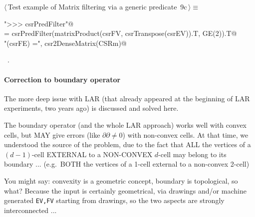 \documentclass[11pt,oneside]{article}    %
\begin{document}
\begin{flushleft} \small \label{scrap17}
\protect{}$\langle\,$Test example of Matrix filtering via a generic predicate\nobreak\ {\footnotesize 9c}$\,\rangle\equiv$
\vspace{-1ex}
\begin{list}{}{} \item
\mbox{}\verb@print "\n>>> csrPredFilter"@\\
\mbox{}\verb@CSRm = csrPredFilter(matrixProduct(csrFV, csrTranspose(csrEV)).T, GE(2)).T@\\
\mbox{}\verb@print "\nccsrPredFilter(csrFE) =\n", csr2DenseMatrix(CSRm)@\\
\mbox{}\verb@@{\NWsep}
\end{list}
\vspace{-1ex}
\footnotesize\addtolength{\baselineskip}{-1ex}
\begin{list}{}{\setlength{\itemsep}{-\parsep}\setlength{\itemindent}{-\leftmargin}}
\item \NWtxtMacroRefIn\ .
\end{list}
\end{flushleft}

\paragraph{Correction to boundary operator}
The more deep issue with LAR (that already appeared at the beginning of LAR experiments, two years ago) is discussed and solved here.

The boundary operator (and the whole LAR approach) works well with convex cells, but MAY give errors (like $\partial\partial \not= 0$) with non-convex cells. At that time, we understood the source of the problem, due to the fact that ALL the vertices of a $(d-1)$-cell  EXTERNAL to a NON-CONVEX $d$-cell may belong to its boundary ... (e.g.~BOTH the vertices of a 1-cell external to a non-convex 2-cell)

You might say: convexity is a geometric concept, boundary is topological, so what? 
Because the input is certainly geometrical, via drawings and/or machine generated \texttt{EV,FV} starting from drawings, so the two aspects are strongly interconnected ... 
\end{document}
